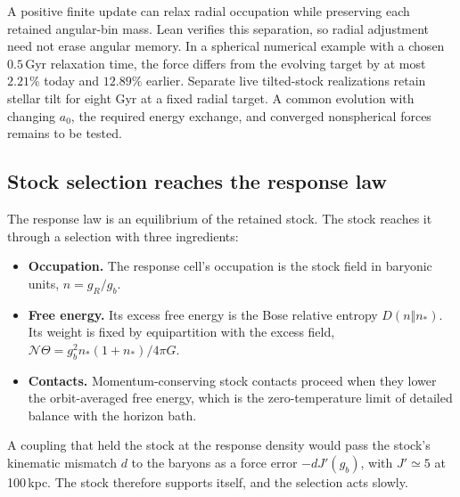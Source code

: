 A positive finite update can relax radial occupation while preserving
each retained angular-bin mass. Lean verifies this separation, so radial
adjustment need not erase angular memory. In a spherical numerical
example with a chosen $0.5\,$Gyr relaxation time, the force differs from
the evolving target by at most $2.21\%$ today and $12.89\%$ earlier.
Separate live tilted-stock realizations retain stellar tilt for eight
Gyr at a fixed radial target. A common evolution with changing $a_0$,
the required energy exchange, and converged nonspherical forces remains
to be tested. 

\subsection{Stock selection reaches the response law}
\label{sec:stockselection}
The response law is an equilibrium of the retained stock. The stock
reaches it through a selection with three ingredients:
\begin{itemize}
\item \textbf{Occupation.} The response cell's occupation is the stock
field in baryonic units, $n=g_R/g_b$.
\item \textbf{Free energy.} Its excess free energy is the Bose relative
entropy $D(n\Vert n_*)$. Its weight is fixed by equipartition with the
excess field, $\mathcal N\Theta=g_b^2n_*(1+n_*)/4\pi G$.
\item \textbf{Contacts.} Momentum-conserving stock contacts proceed when
they lower the orbit-averaged free energy, which is the zero-temperature
limit of detailed balance with the horizon bath.
\end{itemize}
A coupling that held the stock at the response density would pass the
stock's kinematic mismatch $d$ to the baryons as a force error $-dJ'(g_b)$,
with $J'\simeq5$ at 100\,kpc. The stock therefore supports itself, and the
selection acts slowly. 

